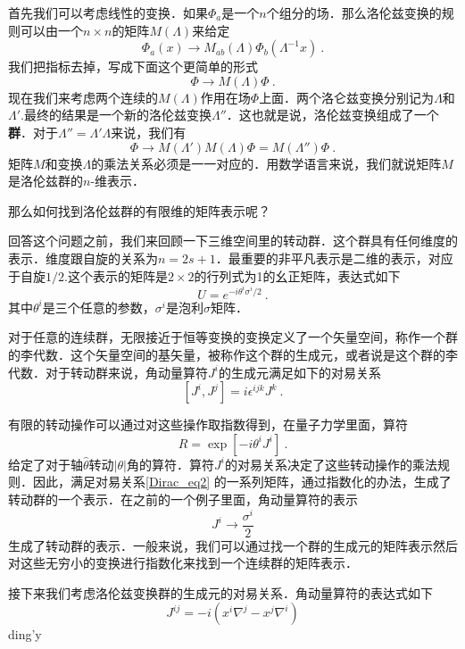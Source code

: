 首先我们可以考虑线性的变换．如果$\Phi_a$是一个$n$个组分的场．那么洛伦兹变换的规则可以由一个$n\times n$的矩阵$M(\Lambda)$来给定
\begin{equation}
\Phi_a (x) \rightarrow M_{ab} (\Lambda) \Phi_b(\Lambda^{-1} x)~.
\end{equation}
我们把指标去掉，写成下面这个更简单的形式
\begin{equation}
\Phi\rightarrow M(\Lambda)\Phi~.
\end{equation}
现在我们来考虑两个连续的$M(\Lambda)$作用在场$\Phi$上面．两个洛仑兹变换分别记为$\Lambda$和$\Lambda'$.最终的结果是一个新的洛伦兹变换$\Lambda''$．这也就是说，洛伦兹变换组成了一个\textbf{群}．对于$\Lambda''=\Lambda'\Lambda$来说，我们有
\begin{equation}
\Phi\rightarrow M(\Lambda')M(\Lambda)\Phi = M(\Lambda'')\Phi~.
\end{equation}
矩阵$M$和变换$\Lambda$的乘法关系必须是一一对应的．用数学语言来说，我们就说矩阵$M$是洛伦兹群的$n$-维表示．

那么如何找到洛伦兹群的有限维的矩阵表示呢？

回答这个问题之前，我们来回顾一下三维空间里的转动群．这个群具有任何维度的表示．维度跟自旋的关系为$n=2s+1$．最重要的非平凡表示是二维的表示，对应于自旋$1/2$.这个表示的矩阵是$2\times 2$的行列式为1的幺正矩阵，表达式如下
\begin{equation}
U = e^{-i\theta^i\sigma^i/2}~.
\end{equation} 
其中$\theta^i$是三个任意的参数，$\sigma^i$是泡利$\sigma$矩阵．

对于任意的连续群，无限接近于恒等变换的变换定义了一个矢量空间，称作一个群的李代数．这个矢量空间的基矢量，被称作这个群的生成元，或者说是这个群的李代数．对于转动群来说，角动量算符$J^i$的生成元满足如下的对易关系
\begin{equation}\label{Dirac_eq2}
[J^i,J^j] = i \epsilon^{ijk} J^k ~.
\end{equation}

有限的转动操作可以通过对这些操作取指数得到，在量子力学里面，算符
\begin{equation}
R = \exp [-i \theta^i J^i]~.
\end{equation}
给定了对于轴$\hat\theta$转动$|\theta|$角的算符．算符$J^i$的对易关系决定了这些转动操作的乘法规则．因此，满足对易关系\autoref{Dirac_eq2} 的一系列矩阵，通过指数化的办法，生成了转动群的一个表示．在之前的一个例子里面，角动量算符的表示
\begin{equation}
J^i \rightarrow \frac{\sigma^i}{2}
\end{equation}
生成了转动群的表示．一般来说，我们可以通过找一个群的生成元的矩阵表示然后对这些无穷小的变换进行指数化来找到一个连续群的矩阵表示．

接下来我们考虑洛伦兹变换群的生成元的对易关系．角动量算符的表达式如下
\begin{equation}
J^{ij} = -i (x^i\nabla^j- x^j\nabla^i)
\end{equation}
ding'y
